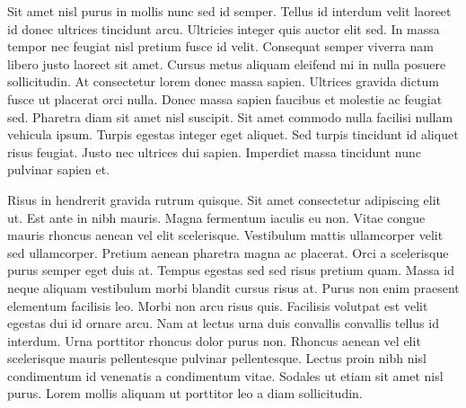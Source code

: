\documentclass[]{article}
\begin{document}
Sit amet nisl purus in mollis nunc sed id semper. Tellus id interdum velit laoreet id donec ultrices tincidunt arcu. Ultricies integer quis auctor elit sed. In massa tempor nec feugiat nisl pretium fusce id velit. Consequat semper viverra nam libero justo laoreet sit amet. Cursus metus aliquam eleifend mi in nulla posuere sollicitudin. At consectetur lorem donec massa sapien. Ultrices gravida dictum fusce ut placerat orci nulla. Donec massa sapien faucibus et molestie ac feugiat sed. Pharetra diam sit amet nisl suscipit. Sit amet commodo nulla facilisi nullam vehicula ipsum. Turpis egestas integer eget aliquet. Sed turpis tincidunt id aliquet risus feugiat. Justo nec ultrices dui sapien. Imperdiet massa tincidunt nunc pulvinar sapien et.

Risus in hendrerit gravida rutrum quisque. Sit amet consectetur adipiscing elit ut. Est ante in nibh mauris. Magna fermentum iaculis eu non. Vitae congue mauris rhoncus aenean vel elit scelerisque. Vestibulum mattis ullamcorper velit sed ullamcorper. Pretium aenean pharetra magna ac placerat. Orci a scelerisque purus semper eget duis at. Tempus egestas sed sed risus pretium quam. Massa id neque aliquam vestibulum morbi blandit cursus risus at. Purus non enim praesent elementum facilisis leo. Morbi non arcu risus quis. Facilisis volutpat est velit egestas dui id ornare arcu. Nam at lectus urna duis convallis convallis tellus id interdum. Urna porttitor rhoncus dolor purus non. Rhoncus aenean vel elit scelerisque mauris pellentesque pulvinar pellentesque. Lectus proin nibh nisl condimentum id venenatis a condimentum vitae. Sodales ut etiam sit amet nisl purus. Lorem mollis aliquam ut porttitor leo a diam sollicitudin.
\end{document}

